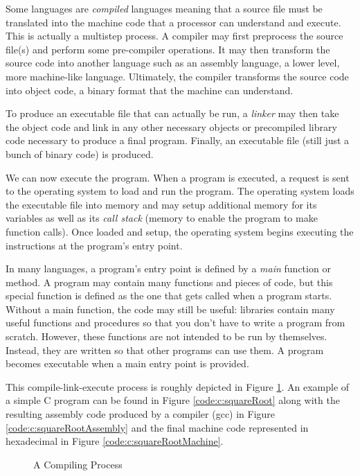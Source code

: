 Some languages are \emph{compiled} languages meaning that a source file
must be translated into the machine code that a processor can understand and
execute.  This is actually a multistep process.  A compiler may first preprocess the
source file(s) and perform some pre-compiler operations.  It may then transform
the source code into another language such as an assembly language, a lower
level, more machine-like language.  Ultimately, the compiler transforms the source
code into object code, a binary format that the machine can understand.  

To produce an executable file that can actually be run, a \emph{linker} may then
take the object code and link in any other necessary objects or precompiled
library code necessary to produce a final program.  Finally, an executable
file (still just a bunch of binary code) is produced.

We can now execute the program.  When a program is executed, a request
is sent to the operating system to load and run the program.  The operating 
system loads the executable file into memory and may setup additional memory
for its variables as well as its \emph{call stack} (memory to enable the program
to make function calls).  Once loaded and setup, the operating system begins
executing the instructions at the program's entry point.  

In many languages, a program's entry point is defined by a \emph{main} function
or method.  A program may contain many functions and pieces of code, but this
special function is defined as the one that gets called when a program starts.  
Without a main function, the code may still be useful: libraries contain many 
useful functions and procedures so that you don't have to write a program 
from scratch.  However, these functions are not intended to be run by themselves.
Instead, they are written so that other programs can use them.  A program
becomes executable when a main entry point is provided.  

This compile-link-execute process is roughly depicted in Figure \ref{figure:compilingProcess}.  An 
example of a simple C program can be found in Figure \ref{code:c:squareRoot}
along with the resulting assembly code produced by a compiler (gcc) in Figure
\ref{code:c:squareRootAssembly} and the final machine code represented
in hexadecimal in Figure \ref{code:c:squareRootMachine}.

\begin{figure}
\centering

\caption{A Compiling Process}
\label{figure:compilingProcess}
\end{figure}


